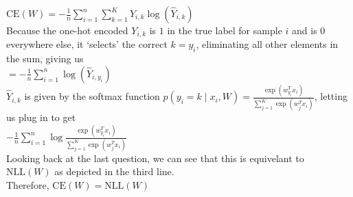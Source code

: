 \documentclass[11pt]{article}
\begin{document}
\begin{enumerate}
\begin{answertext}{9cm}{}
$\mathrm{CE}(W) = -\frac{1}{n}\sum_{i=1}^n\sum_{k=1}^K Y_{i,k} \log(\hat{Y}_{i,k})$\\
Because the one-hot encoded $Y_{i,k}$ is $1$ in the true label for sample $i$ and is $0$ everywhere else, it `selects' the correct $k = y_i$, eliminating all other elements in the sum, giving us\\
$= -\frac{1}{n}\sum_{i=1}^{n} \log(\hat{Y}_{i,y_i})$\\
$\hat{Y}_{i,k}$ is given by the softmax function $p(y_i = k \mid x_i, W) = \frac{\exp(w_{y_i}^T x_i)}{\sum_{j=1}^K\exp(w_j^T x_i)}$, letting us plug in to get\\
$-\frac{1}{n} \sum_{i=1}^{n} \log \frac{\exp(w_{y_i}^T x_i)}{\sum_{j=1}^K\exp(w_j^T x_i)}$\\
Looking back at the last question, we can see that this is equivelant to $\mathrm{NLL}(W)$ as depicted in the third line.\\
Therefore, $\mathrm{CE}(W) = \mathrm{NLL}(W)$
  
\end{answertext} 

\end{enumerate}
\end{document}
